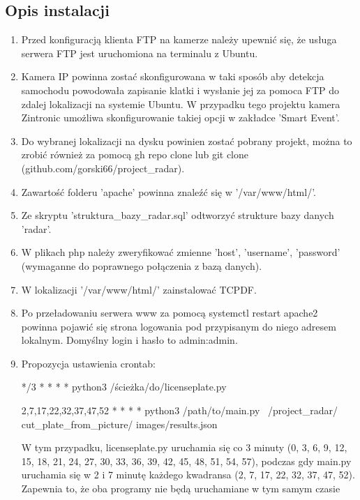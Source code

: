 \documentclass[12pt,a4paper,oneside]{article}
\theoremstyle{definition}
\numberwithin{equation}{section}
\begin{document}
\subsection{Opis instalacji}
\begin{enumerate}
  \item Przed konfiguracją klienta FTP na kamerze należy upewnić się, że usługa serwera FTP jest uruchomiona na terminalu z Ubuntu. 
  \item Kamera IP powinna zostać skonfigurowana w taki sposób aby detekcja samochodu powodowała zapisanie klatki i wysłanie jej za pomoca FTP do zdalej lokalizacji na systemie Ubuntu. W przypadku tego projektu kamera Zintronic umożliwa skonfigurowanie takiej opcji w zakładce 'Smart Event'.
  \item Do wybranej lokalizacji na dysku powinien zostać pobrany projekt, można to zrobić również za pomocą gh repo clone lub git clone (github.com/gorski66/project{\_}radar).
  \item Zawartość folderu 'apache' powinna znaleźć się w '/var/www/html/'.
  \item Ze skryptu 'struktura{\_}bazy{\_}radar.sql' odtworzyć strukture bazy danych 'radar'.
  \item W plikach php należy zweryfikować zmienne 'host', 'username', 'password' (wymaganne do poprawnego połączenia z bazą danych). 
  \item W lokalizacji '/var/www/html/' zainstalować TCPDF.
  \item Po przeładowaniu serwera www za pomocą systemctl restart apache2 powinna pojawić się strona logowania pod przypisanym do niego adresem lokalnym. Domyślny login i hasło to admin:admin. 
  \item Propozycja ustawienia crontab:

        */3 * * * * python3 /ścieżka/do/licenseplate.py
        
        2,7,17,22,32,37,47,52 * * * * python3 /path/to/main.py ~/project{\_}radar/
        cut{\_}plate{\_}from{\_}picture/
        images/results.json
        
        W tym przypadku, licenseplate.py uruchamia się co 3 minuty (0, 3, 6, 9, 12, 15, 18, 21, 24, 27, 30, 33, 36, 39, 42, 45, 48, 51, 54, 57), podczas gdy main.py uruchamia się w 2 i 7 minutę każdego kwadransa (2, 7, 17, 22, 32, 37, 47, 52). Zapewnia to, że oba programy nie będą uruchamiane w tym samym czasie
\end{enumerate}




%
%
%
\end{document}
